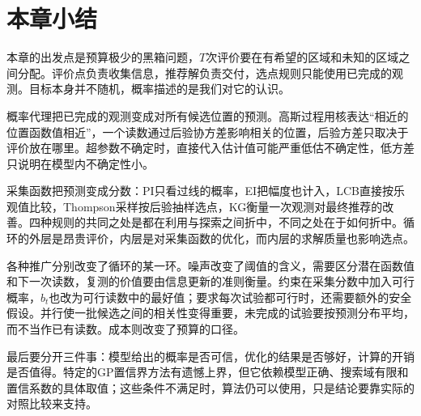 \section{本章小结}
\label{sec:bo-summary}

本章的出发点是预算极少的黑箱问题，$T$次评价要在有希望的区域和未知的区域之间分配。评价点负责收集信息，推荐解负责交付，选点规则只能使用已完成的观测。目标本身并不随机，概率描述的是我们对它的认识。

概率代理把已完成的观测变成对所有候选位置的预测。高斯过程用核表达“相近的位置函数值相近”，一个读数通过后验协方差影响相关的位置，后验方差只取决于评价放在哪里。超参数不确定时，直接代入估计值可能严重低估不确定性，低方差只说明在模型内不确定性小。

采集函数把预测变成分数：PI只看过线的概率，EI把幅度也计入，LCB直接按乐观值比较，Thompson采样按后验抽样选点，KG衡量一次观测对最终推荐的改善。四种规则的共同之处是都在利用与探索之间折中，不同之处在于如何折中。循环的外层是昂贵评价，内层是对采集函数的优化，而内层的求解质量也影响选点。

各种推广分别改变了循环的某一环。噪声改变了阈值的含义，需要区分潜在函数值和下一次读数，复测的价值要由信息更新的准则衡量。约束在采集分数中加入可行概率，$b_t$也改为可行读数中的最好值；要求每次试验都可行时，还需要额外的安全假设。并行使一批候选之间的相关性变得重要，未完成的试验要按预测分布平均，而不当作已有读数。成本则改变了预算的口径。

最后要分开三件事：模型给出的概率是否可信，优化的结果是否够好，计算的开销是否值得。特定的GP置信界方法有遗憾上界，但它依赖模型正确、搜索域有限和置信系数的具体取值；这些条件不满足时，算法仍可以使用，只是结论要靠实际的对照比较来支持。
